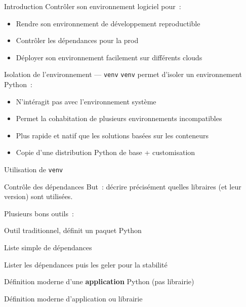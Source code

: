 \begin{frame}{Introduction}
  Contrôler son environnement logiciel pour~:
  \begin{itemize}[<+->]
    \item Rendre son environnement de développement reproductible
    \item Contrôler les dépendances pour la prod
    \item Déployer son environnement facilement sur différents clouds
  \end{itemize}
\end{frame}

\begin{frame}{Isolation de l'environnement --- \texttt{venv}}
  \texttt{venv} permet d'isoler un environnement Python~:
  \begin{itemize}[<+->]
    \item N'intéragit pas avec l'environnement système
    \item Permet la cohabitation de plusieurs environnements incompatibles
    \item Plus rapide et natif que les solutions basées sur les conteneurs
    \item Copie d'une distribution Python de base + customisation
  \end{itemize}
\end{frame}

\begin{frame}{Utilisation de \texttt{venv}}
\end{frame}

\begin{frame}{Contrôle des dépendances}
  But~: décrire précisément quelles libraires (et leur version) sont utilisées.

  Plusieurs bons outils~:

  \begin{description}[<+->]
    \item[\texttt{pip} + \texttt{setup.py}] Outil traditionnel, définit un paquet Python
    \item[\texttt{pip} + \texttt{requirements.txt}] Liste simple de dépendances
    \item[\texttt{pip} + \texttt{pip-compile}] Lister les dépendances puis les geler pour la stabilité
    \item[\texttt{Pipenv}] Définition moderne d'une \textbf{application} Python (pas librairie)
    \item[\texttt{poetry}] Définition moderne d'application ou librairie
  \end{description}
\end{frame}

